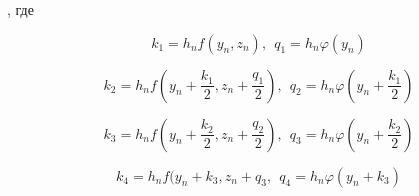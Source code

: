 , где

\begin{equation*}
    k_1 = h_n f(y_n, z_n), ~~q_1 = h_n \varphi (y_n)
\end{equation*}

\begin{equation*}
    k_2 = h_n f (y_n + \frac{k_1}{2}, z_n + \frac{q_1}{2}),~~ q_2 = h_n \varphi(y_n + \frac{k_1}{2})
\end{equation*}

\begin{equation*}
    k_3 = h_n f (y_n + \frac{k_2}{2}, z_n + \frac{q_2}{2}), ~~q_3 = h_n \varphi(y_n + \frac{k_2}{2})
\end{equation*}

\begin{equation*}
    k_4 = h_n f (y_n + k_3, z_n + q_3, ~~q_4 = h_n \varphi(y_n + k_3)
\end{equation*}
